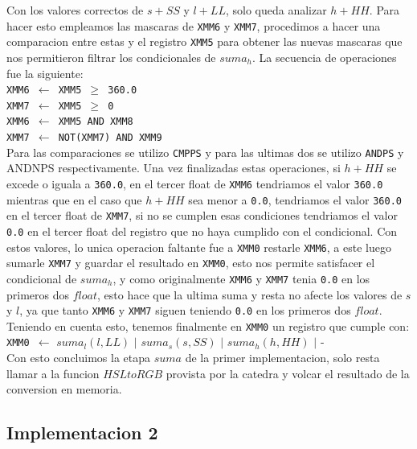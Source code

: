 Con los valores correctos de $s + SS$ y $l + LL$, solo queda analizar $h + HH$. Para hacer esto empleamos las mascaras de \texttt{XMM6} y \texttt{XMM7}, procedimos a hacer una comparacion entre estas y el registro \texttt{XMM5} para obtener las nuevas mascaras que nos permitieron filtrar los condicionales de $suma_h$. La secuencia de operaciones fue la siguiente:\\

\noindent
\texttt{XMM6 $\gets$ XMM5 $\geq$ 360.0} \\
\texttt{XMM7 $\gets$ XMM5 $\geq$ 0} \\
\texttt{XMM6 $\gets$ XMM5 AND XMM8} \\
\texttt{XMM7 $\gets$ NOT(XMM7) AND XMM9} \\

Para las comparaciones se utilizo \texttt{CMPPS} y para las ultimas dos se utilizo \texttt{ANDPS} y \textsc{ANDNPS} respectivamente. Una vez finalizadas estas operaciones, si $h + HH$ se excede o iguala a \texttt{360.0}, en el tercer float de \texttt{XMM6} tendriamos el valor \texttt{360.0} mientras que en el caso que $h + HH$ sea menor a \texttt{0.0}, tendriamos el valor \texttt{360.0} en el tercer float de \texttt{XMM7}, si no se cumplen esas condiciones tendriamos el valor \texttt{0.0} en el tercer float del registro que no haya cumplido con el condicional. Con estos valores, lo unica operacion faltante fue a \texttt{XMM0} restarle \texttt{XMM6}, a este luego sumarle \texttt{XMM7} y guardar el resultado en \texttt{XMM0}, esto nos permite satisfacer el condicional de $suma_h$, y como originalmente \texttt{XMM6} y \texttt{XMM7} tenia \texttt{0.0} en los primeros dos $float$, esto hace que la ultima suma y resta no afecte los valores de $s$ y $l$, ya que tanto \texttt{XMM6} y \texttt{XMM7} siguen teniendo \texttt{0.0} en los primeros dos $float$. Teniendo en cuenta esto, tenemos finalmente en \texttt{XMM0} un registro que cumple con:\\

\noindent
\texttt{XMM0 $\gets$} $suma_l(l,LL)$ $\vert$ $suma_s(s,SS)$ $\vert$ $suma_h(h,HH)$ $\vert$ - \\

Con esto concluimos la etapa $suma$ de la primer implementacion, solo resta llamar a la funcion $HSLtoRGB$ provista por la catedra y volcar el resultado de la conversion en memoria.

\subsection{Implementacion 2}

